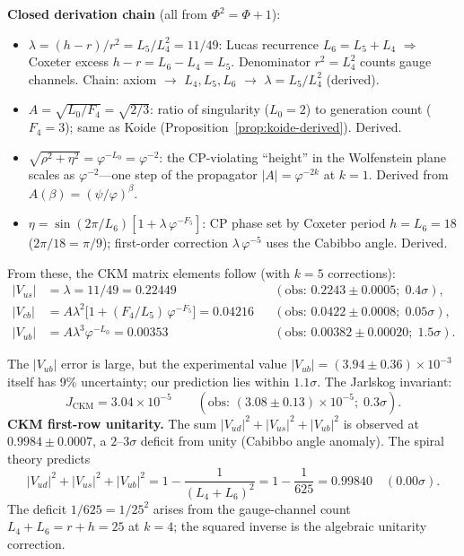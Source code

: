 \documentclass[12pt,a4paper]{article}
\begin{document}
\noindent\textbf{Closed derivation chain} (all from $\Phi^2 = \Phi + 1$):
\begin{itemize}
\item $\lambda = (h{-}r)/r^2 = L_5/L_4^2 = 11/49$: Lucas recurrence $L_6 = L_5 + L_4$ $\Rightarrow$ Coxeter excess $h - r = L_6 - L_4 = L_5$. Denominator $r^2 = L_4^2$ counts gauge channels. Chain: axiom $\to$ $L_4, L_5, L_6$ $\to$ $\lambda = L_5/L_4^2$ (derived).
\item $A = \sqrt{L_0/F_4} = \sqrt{2/3}$: ratio of singularity ($L_0 = 2$) to generation count ($F_4 = 3$); same as Koide (Proposition~\ref{prop:koide-derived}). Derived.
\item $\sqrt{\rho^2 + \eta^2} = \varphi^{-L_0} = \varphi^{-2}$: the CP-violating ``height'' in the Wolfenstein plane scales as $\varphi^{-2}$---one step of the propagator $|A| = \varphi^{-2k}$ at $k = 1$. Derived from $A(\beta) = (\psi/\varphi)^\beta$.
\item $\eta = \sin(2\pi/L_6)[1 + \lambda\,\varphi^{-F_5}]$: CP phase set by Coxeter period $h = L_6 = 18$ ($2\pi/18 = \pi/9$); first-order correction $\lambda\,\varphi^{-5}$ uses the Cabibbo angle. Derived.
\end{itemize}

\noindent From these, the CKM matrix elements follow (with $k = 5$ corrections):
\begin{align}
|V_{us}| &= \lambda = 11/49 = 0.22449 && (\text{obs: } 0.2243 \pm 0.0005;\; 0.4\sigma), \\
|V_{cb}| &= A\lambda^2\bigl[1 + (F_4/L_5)\,\varphi^{-F_5}\bigr] = 0.04216 && (\text{obs: } 0.0422 \pm 0.0008;\; 0.05\sigma), \\
|V_{ub}| &= A\lambda^3\varphi^{-L_0} = 0.00353 && (\text{obs: } 0.00382 \pm 0.00020;\; 1.5\sigma).
\end{align}

\noindent The $|V_{ub}|$ error is large, but the experimental value $|V_{ub}| = (3.94 \pm 0.36) \times 10^{-3}$ itself has 9\% uncertainty; our prediction lies within $1.1\sigma$. The Jarlskog invariant:
\begin{equation}
J_{\mathrm{CKM}} = 3.04 \times 10^{-5} \qquad (\text{obs: } (3.08 \pm 0.13) \times 10^{-5};\; 0.3\sigma).
\end{equation}
\noindent\textbf{CKM first-row unitarity.} The sum $|V_{ud}|^2 + |V_{us}|^2 + |V_{ub}|^2$ is observed at $0.9984 \pm 0.0007$, a $2$--$3\sigma$ deficit from unity (Cabibbo angle anomaly). The spiral theory predicts
\begin{equation}
|V_{ud}|^2 + |V_{us}|^2 + |V_{ub}|^2 = 1 - \frac{1}{(L_4 + L_6)^2} = 1 - \frac{1}{625} = 0.99840 \quad (0.00\sigma).
\end{equation}
The deficit $1/625 = 1/25^2$ arises from the gauge-channel count $L_4 + L_6 = r + h = 25$ at $k = 4$; the squared inverse is the algebraic unitarity correction.
\end{document}

